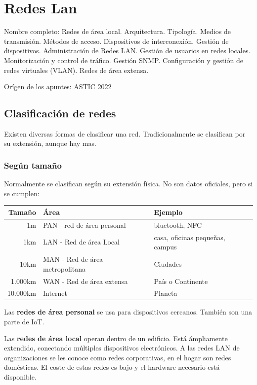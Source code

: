 \setcounter{section}{117}
\section{Redes Lan}

Nombre completo:  Redes de área local. Arquitectura. Tipología. Medios de transmisión. Métodos de acceso. Dispositivos de interconexión. Gestión de dispositivos. Administración de Redes LAN. Gestión de usuarios en redes locales. Monitorización y control de tráfico. Gestión SNMP. Configuración y gestión de redes virtuales (VLAN). Redes de área extensa.

Orígen de los apuntes: ASTIC 2022

\localtableofcontents

\subsection{Clasificación de redes} %
    Existen diversas formas de clasificar una red. Tradicionalmente se clasifican por su extensión, aunque hay mas.
    \subsubsection{Según tamaño} %
        Normalmente se clasifican según su extensión física. No son datos oficiales, pero si se cumplen:
        \begin{table}[H]
        \begin{tabular}{rll}
            Tamaño & Área & Ejemplo \\
            \midrule
            1m       & PAN - red de área personal & bluetooth, NFC\\
            1km      & LAN - Red de área Local & casa, oficinas pequeñas, campus \\
            10km     & MAN - Red de área metropolitana & Ciudades\\
            1.000km  & WAN - Red de área extensa & País o Continente\\
            10.000km & Internet & Planeta\\
        \end{tabular}
        \end{table}

        Las \textbf{redes de área personal} se usa para dispositivos cercanos. También son una parte de IoT.

        Las \textbf{redes de área local} operan dentro de un edificio. Está ámpliamente extendido, conectando múltiples dispositivos electrónicos. A las redes LAN de organizaciones se les conoce como redes corporativas, en el hogar son redes domésticas. El coste de estas redes es bajo y el hardware necesario está disponible.

